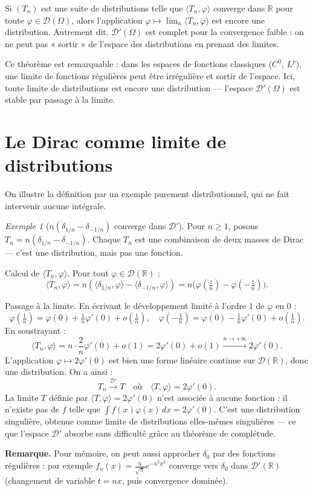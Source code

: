 \documentclass[12pt,a4paper,openany]{book}
\theoremstyle{definition}
\theoremstyle{plain}
\theoremstyle{remark}
\newtheorem*{example}{Exemple}
\begin{document}
	Si $(T_n)$ est une suite de distributions telle que $\langle T_n, \varphi \rangle$ converge dans $\mathbb{R}$ pour toute $\varphi \in \mathcal{D}(\Omega)$, alors l'application $\varphi \mapsto \lim_n \langle T_n, \varphi \rangle$ est encore une distribution. Autrement dit, $\mathcal{D}'(\Omega)$ est complet pour la convergence faible : on ne peut pas « sortir » de l'espace des distributions en prenant des limites.
	
	Ce théorème est remarquable : dans les espaces de fonctions classiques ($C^0$, $L^p$), une limite de fonctions régulières peut être irrégulière et sortir de l'espace. Ici, toute limite de distributions est encore une distribution — l'espace $\mathcal{D}'(\Omega)$ est stable par passage à la limite.
	
	\section{Le Dirac comme limite de distributions}
	
	On illustre la définition par un exemple purement distributionnel, qui ne fait intervenir aucune intégrale.
	
	\begin{example}[$n(\delta_{1/n} - \delta_{-1/n})$ converge dans $\mathcal{D}'$]
		Pour $n \ge 1$, posons $T_n = n(\delta_{1/n} - \delta_{-1/n})$. Chaque $T_n$ est une combinaison de deux masses de Dirac — c'est une distribution, mais pas une fonction.
		
		Calcul de $\langle T_n, \varphi \rangle$. Pour tout $\varphi \in \mathcal{D}(\mathbb{R})$ :
		\[
		\langle T_n, \varphi \rangle = n(\langle \delta_{1/n}, \varphi \rangle - \langle \delta_{-1/n}, \varphi \rangle) = n\bigl(\varphi(\tfrac{1}{n}) - \varphi(-\tfrac{1}{n})\bigr).
		\]
		
		Passage à la limite. En écrivant le développement limité à l'ordre $1$ de $\varphi$ en $0$ :
		\[
		\varphi(\tfrac{1}{n}) = \varphi(0) + \tfrac{1}{n}\varphi'(0) + o(\tfrac{1}{n}), \quad
		\varphi(-\tfrac{1}{n}) = \varphi(0) - \tfrac{1}{n}\varphi'(0) + o(\tfrac{1}{n}).
		\]
		En soustrayant :
		\[
		\langle T_n, \varphi \rangle = n \cdot \frac{2}{n} \varphi'(0) + o(1) = 2\varphi'(0) + o(1) \xrightarrow{n \to +\infty} 2\varphi'(0).
		\]
		L'application $\varphi \mapsto 2\varphi'(0)$ est bien une forme linéaire continue sur $\mathcal{D}(\mathbb{R})$, donc une distribution. On a ainsi :
		\[
		T_n \xrightarrow{\mathcal{D}'} T \quad \text{où} \quad \langle T, \varphi \rangle = 2\varphi'(0).
		\]
		La limite $T$ définie par $\langle T, \varphi \rangle = 2\varphi'(0)$ n'est associée à aucune fonction : il n'existe pas de $f$ telle que $\int f(x)\varphi(x)\,dx = 2\varphi'(0)$. C'est une distribution singulière, obtenue comme limite de distributions elles-mêmes singulières — ce que l'espace $\mathcal{D}'$ absorbe sans difficulté grâce au théorème de complétude.
		
		\textbf{Remarque.} Pour mémoire, on peut aussi approcher $\delta_0$ par des fonctions régulières : par exemple $f_n(x) = \frac{n}{\sqrt{\pi}} e^{-n^2 x^2}$ converge vers $\delta_0$ dans $\mathcal{D}'(\mathbb{R})$ (changement de variable $t = nx$, puis convergence dominée).
	\end{example}
	
\end{document}
